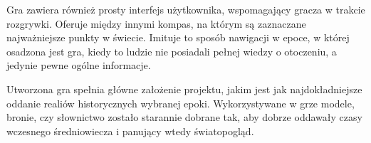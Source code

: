 Gra zawiera również prosty interfejs użytkownika, wspomagający gracza w trakcie rozgrywki. Oferuje między innymi kompas,
na którym są zaznaczane najważniejsze punkty w świecie. Imituje to sposób nawigacji w epoce, w której osadzona jest gra,
kiedy to ludzie nie posiadali pełnej wiedzy o otoczeniu, a jedynie pewne ogólne informacje.

Utworzona gra spełnia główne założenie projektu, jakim jest jak najdokładniejsze oddanie realiów historycznych wybranej
epoki. Wykorzystywane w grze modele, bronie, czy słownictwo zostało starannie dobrane tak, aby dobrze oddawały
czasy wczesnego średniowiecza i panujący wtedy światopogląd.




